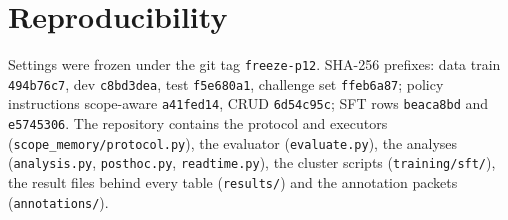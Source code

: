 \documentclass[11pt]{article}
\begin{document}
\section{Reproducibility}\label{app:repro}
Settings were frozen under the git tag \texttt{freeze-p12}. SHA-256 prefixes: data train \texttt{494b76c7}, dev \texttt{c8bd3dea}, test \texttt{f5e680a1}, challenge set \texttt{ffeb6a87}; policy instructions scope-aware \texttt{a41fed14}, CRUD \texttt{6d54c95c}; SFT rows \texttt{beaca8bd} and \texttt{e5745306}. The repository contains the protocol and executors (\texttt{scope\_memory/protocol.py}), the evaluator (\texttt{evaluate.py}), the analyses (\texttt{analysis.py}, \texttt{posthoc.py}, \texttt{readtime.py}), the cluster scripts (\texttt{training/sft/}), the result files behind every table (\texttt{results/}) and the annotation packets (\texttt{annotations/}).
\end{document}
